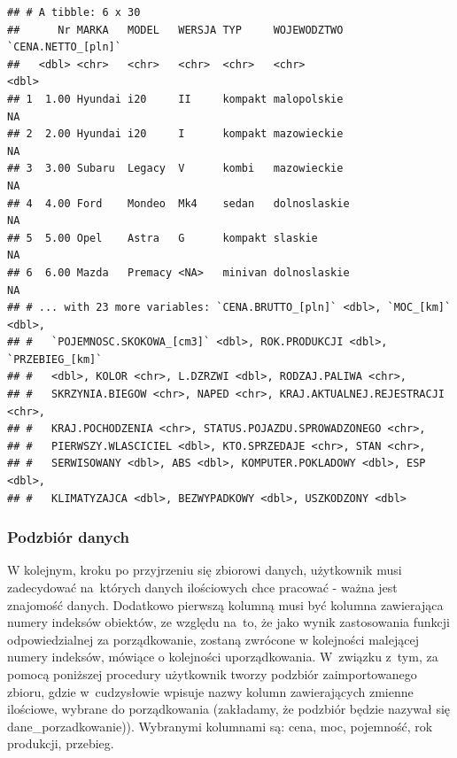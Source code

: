 \documentclass[12pt,a4paper]{report}
\begin{document}
{\begin{verbatim}
## # A tibble: 6 x 30
##      Nr MARKA   MODEL   WERSJA TYP     WOJEWODZTWO  `CENA.NETTO_[pln]`
##   <dbl> <chr>   <chr>   <chr>  <chr>   <chr>                     <dbl>
## 1  1.00 Hyundai i20     II     kompakt malopolskie                  NA
## 2  2.00 Hyundai i20     I      kompakt mazowieckie                  NA
## 3  3.00 Subaru  Legacy  V      kombi   mazowieckie                  NA
## 4  4.00 Ford    Mondeo  Mk4    sedan   dolnoslaskie                 NA
## 5  5.00 Opel    Astra   G      kompakt slaskie                      NA
## 6  6.00 Mazda   Premacy <NA>   minivan dolnoslaskie                 NA
## # ... with 23 more variables: `CENA.BRUTTO_[pln]` <dbl>, `MOC_[km]` <dbl>,
## #   `POJEMNOSC.SKOKOWA_[cm3]` <dbl>, ROK.PRODUKCJI <dbl>, `PRZEBIEG_[km]`
## #   <dbl>, KOLOR <chr>, L.DZRZWI <dbl>, RODZAJ.PALIWA <chr>,
## #   SKRZYNIA.BIEGOW <chr>, NAPED <chr>, KRAJ.AKTUALNEJ.REJESTRACJI <chr>,
## #   KRAJ.POCHODZENIA <chr>, STATUS.POJAZDU.SPROWADZONEGO <chr>,
## #   PIERWSZY.WLASCICIEL <dbl>, KTO.SPRZEDAJE <chr>, STAN <chr>,
## #   SERWISOWANY <dbl>, ABS <dbl>, KOMPUTER.POKLADOWY <dbl>, ESP <dbl>,
## #   KLIMATYZAJCA <dbl>, BEZWYPADKOWY <dbl>, USZKODZONY <dbl>
\end{verbatim}

\subsubsection{Podzbiór danych}\label{podzbior-danych}

W kolejnym, kroku po przyjrzeniu się zbiorowi danych, użytkownik musi
zadecydować na~których danych ilościowych chce pracować - ważna jest
znajomość danych. Dodatkowo pierwszą kolumną musi być kolumna
zawierająca numery indeksów obiektów, ze względu na~to, że jako wynik
zastosowania funkcji odpowiedzialnej za porządkowanie, zostaną zwrócone
w kolejności malejącej numery indeksów, mówiące o kolejności
uporządkowania. W~związku z~tym, za pomocą poniższej procedury
użytkownik tworzy podzbiór zaimportowanego zbioru, gdzie w~cudzysłowie
wpisuje nazwy kolumn zawierających zmienne ilościowe, wybrane do
porządkowania (zakładamy, że podzbiór będzie nazywał się
dane\_porzadkowanie)). Wybranymi kolumnami są: cena, moc, pojemność, rok produkcji,
przebieg.

\begin{Shaded}
\begin{Highlighting}[]
\NormalTok{dane_porzadkowanie<-zbior_danych[}\NormalTok{(}\NormalTok{,}\NormalTok{,}\NormalTok{,}
                                   \NormalTok{,}
                                  \NormalTok{,}\NormalTok{)]}
\end{Highlighting}
\end{Shaded}

}
\end{document}
